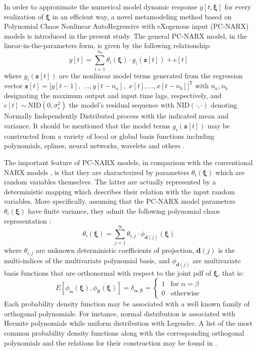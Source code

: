 \documentclass[12pt,a4paper,twocolumn,fleqn]{narms}
\newcommand{\bld}[1]{\boldsymbol{#1}}
\newcommand{\bxi}{\bld{\xi}}
\newcommand{\beq}{\begin{equation}}
\newcommand{\eeq}{\end{equation}}
\begin{document}
In order to approximate the numerical model dynamic response $y[t,\bxi]$ for every realization of $\bxi$ in an efficient way, a novel metamodeling method based on Polynomial Chaos Nonlinear AutoRegressive with eXogenous input (PC-NARX) models is introduced in the present study. The general PC-NARX model, in the linear-in-the-parameters form, is given by the following relationship:
\beq y[t] =  \sum_{i=1}^{n_\theta} \theta_i(\bxi) \cdot g_i({\bld z}[t]) + e[t] \label{eq:PCNARX}\eeq
where $g_i({\bld z}[t])$ are the nonlinear model terms generated from the regression vector ${\bld z}[t] = \bigl[ y[t-1],$ $\ldots, y[t-n_a], $ $x[t],\ldots ,x[t-n_b] \bigr]^\mathsf{T}$ with $n_a, n_b$ designating the maximum output and input time lags, respectively, and $e[t]\! \sim\! \text{NID} (0,\sigma^2_e)$ the model's residual sequence with NID$(\cdot,\cdot)$ denoting Normally Independently Distributed process with the indicated mean and variance. It should be mentioned that the model terms $g_i({\bld z}[t])$ may be constructed from a variety of local or global basis functions including polynomials, splines, neural networks, wavelets and others \cite{Wei-Billings2009}.

The important feature of PC-NARX models, in comparison with the conventional NARX models \cite{Chen-Billings1989}, is that they are characterized by parameters $\theta_i(\bxi)$ which are random variables themselves. The latter are actually represented by a deterministic mapping which describes their relation with the input random variables. More specifically, assuming that the PC-NARX model parameters $\theta_i(\bxi)$ have finite variance, they admit the following polynomial chaos representation \cite{Soize-Ghanem2004}:
\beq 
\theta_i (\bxi) = \sum_{j=1}^{\infty } \theta_{i,j}\cdot \phi_{\bld{d}(j)}(\bxi) \label{eq:PCE}
\eeq
where $\theta_{i,j}$ are unknown deterministic coefficients of projection, ${\bld d}{(j)}$ is the multi-indices of the multivariate polynomial basis, and $\phi_{{\bld d}(j)}$ are multivariate basis functions that are orthonormal with respect to the joint pdf of $\bxi$, that is:
\beq
E[ \phi_{\bld \alpha} (\bxi), \phi_{\bld \beta} (\bxi) ] = \delta_{{\bld \alpha},{\bld \beta}} =\begin{cases} 1 & \mbox{for } \alpha = \beta \\ 0 & \mbox{otherwise} \end{cases}
\eeq
Each probability density function may be associated with a well known family of orthogonal polynomials. For instance, normal distribution is associated with Hermite polynomials while uniform distribution with Legendre. A list of the most common probability density functions along with the corresponding orthogonal polynomials and the relations for their construction may be found in \cite{Soize-Ghanem2004}.
\end{document}
